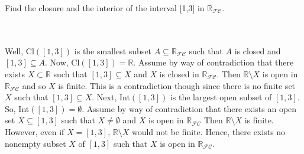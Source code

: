 Find the closure and the interior of the interval [1,3] in $\mathbb{R}_{\mathcal{FC}}$.\\\\


\begin{solution}\renewcommand{\qedsymbol}{}\ \\
    Well, Cl$([1,3])$ is the smallest subset $A\subseteq\mathbb{R}_{\mathcal{FC}}$ such that $A$ is
    closed and $[1,3]\subseteq A$. Now, Cl$([1,3])=\mathbb{R}$. Assume by way of contradiction that
    there exists $X\subset\mathbb{R}$ such that $[1,3]\subseteq X$ and $X$ is closed in
    $\mathbb{R}_{\mathcal{FC}}$. Then $\mathbb{R}\setminus X$ is open in $\mathbb{R}_{\mathcal{FC}}$ and
    so $X$ is finite. This is a contradiction though since there is no finite set $X$ such that
    $[1,3]\subseteq X$. Next, Int$([1,3])$ is the largest open subset of $[1,3]$. So,
    Int$([1,3])=\emptyset$. Assume by way of contradiction that there exists an open set
    $X\subseteq[1,3]$ such that $X\neq\emptyset$ and $X$ is open in $\mathbb{R}_{\mathcal{FC}}$ Then
    $\mathbb{R}\setminus X$ is finite. However, even if $X=[1,3]$, $\mathbb{R}\setminus X$ would not be
    finite. Hence, there exists no nonempty subset $X$ of $[1,3]$ such that $X$ is open in
    $\mathbb{R}_{\mathcal{FC}}$.

\end{solution}